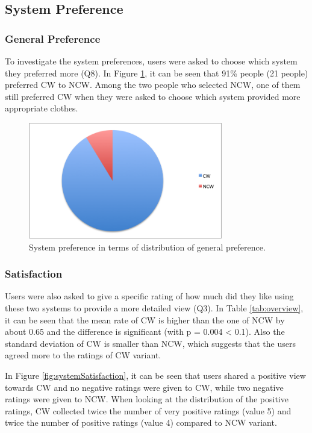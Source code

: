 \subsection{System Preference} \label{sec:results_sp}

\subsubsection{General Preference} \label{sec:results_sp_gp}

To investigate the system preferences, users were asked to choose which system they preferred more (Q8). In Figure \ref{fig:generalPreference}, it can be seen that 91\% people (21 people) preferred CW to NCW. Among the two people who selected NCW, one of them still preferred CW when they were asked to choose which system provided more appropriate clothes.

\begin{figure}[H]
	\centering
	\includegraphics[height=2in]{figures/generalPreference.png}
	\caption{System preference in terms of distribution of general preference.}
	\label{fig:generalPreference}
\end{figure}


\subsubsection{Satisfaction} \label{sec:results_sp_s}

Users were also asked to give a specific rating of how much did they like using these two systems to provide a more detailed view (Q3). In Table \ref{tab:overview}, it can be seen that the mean rate of CW is higher than the one of NCW by about 0.65 and the difference is significant (with p = 0.004 < 0.1). Also the standard deviation of CW is smaller than NCW, which suggests that the users agreed more to the ratings of CW variant.

In Figure \ref{fig:systemSatisfaction}, it can be seen that users shared a positive view towards CW and no negative ratings were given to CW, while two negative ratings were given to NCW. When looking at the distribution of the positive ratings, CW collected twice the number of very positive ratings (value 5) and twice the number of positive ratings (value 4) compared to NCW variant. 

